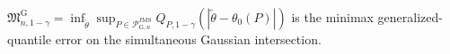 \(\mathfrak M_{n,1-\gamma}^{\mathrm G}=\inf_{\widetilde\theta}\sup_{P\in\mathcal P_{\mathrm G,n}^{\mathrm{JMS}}}Q_{P,1-\gamma}(|\widetilde\theta-\theta_0(P)|)\) is the minimax generalized-quantile error on the simultaneous Gaussian intersection.